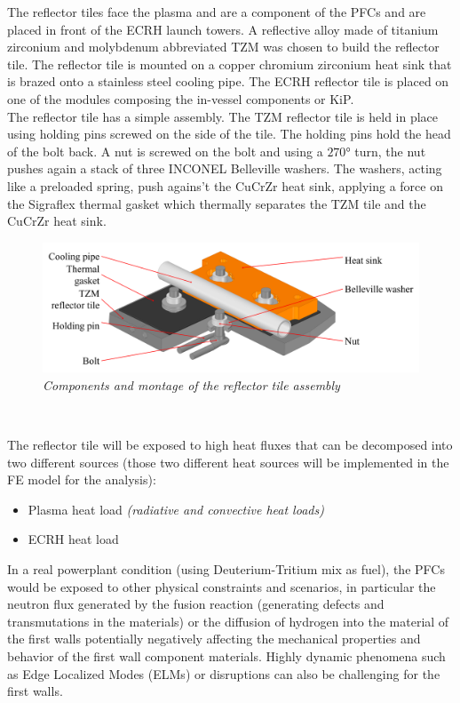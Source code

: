 \normalsize{\indent The reflector tiles face the plasma and are a component of the \acrshort{PFCs} and are placed in front of the \acrshort{ECRH} launch towers. A reflective alloy made of titanium zirconium and molybdenum abbreviated \acrshort{TZM} was chosen to build the reflector tile. The reflector tile is mounted on a copper chromium zirconium heat sink that is brazed onto a stainless steel cooling pipe. The \acrshort{ECRH} reflector tile is placed on one of the modules composing the in-vessel components or \acrshort{KiP}.}
\\
\break
\normalsize{\indent The reflector tile has a simple assembly. The \acrshort{TZM} reflector tile is held in place using holding pins screwed on the side of the tile. The holding pins hold the head of the bolt back. A nut is screwed on the bolt and using a $270 \si{\degree}$ turn, the nut pushes again a stack of three INCONEL Belleville washers. The washers, acting like a preloaded spring, push agains't the \acrshort{CuCrZr} heat sink, applying a force on the \acrshort{Sigraflex} thermal gasket which thermally separates the \acrshort{TZM} tile and the \acrshort{CuCrZr} heat sink.}
\begin{figure}[h!]
    \centering
    \includegraphics[width=1\textwidth]{figures/montage2.png}
    \caption{\it Components and montage of the reflector tile assembly}
    \label{fig:fig_3_2}
\end{figure}
\\
\break
\normalsize{\indent The reflector tile will be exposed to high heat fluxes that can be decomposed into two different sources (those two different heat sources will be implemented in the \acrshort{FE} model for the analysis):
\begin{itemize}
    \item Plasma heat load {\it (radiative and convective heat loads)}
    \item \acrshort{ECRH} heat load
\end{itemize}
In a real powerplant condition (using Deuterium-Tritium mix as fuel), the \acrshort{PFCs} would be exposed to other physical constraints and scenarios, in particular the neutron flux generated by the fusion reaction (generating defects and transmutations in the materials) or the diffusion of hydrogen into the material of the first walls potentially negatively affecting the mechanical properties and behavior of the first wall component materials. Highly dynamic phenomena such as Edge Localized Modes (\acrshort{ELMs}) or disruptions can also be challenging for the first walls.}
